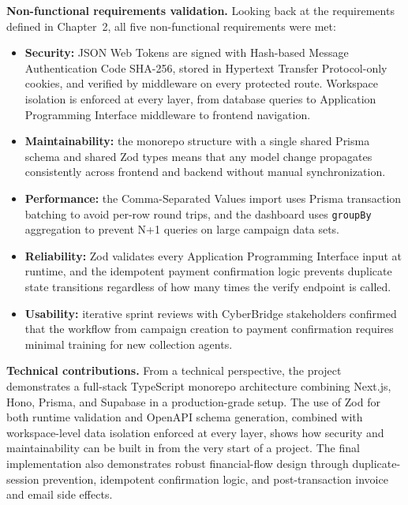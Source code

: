 \documentclass[12pt,a4paper]{report}
\begin{document}
\textbf{Non-functional requirements validation.}
Looking back at the requirements defined in Chapter~2, all five non-functional
requirements were met:
\begin{itemize}
  \item \textbf{Security:} JSON Web Tokens are signed with Hash-based Message Authentication Code SHA-256, stored in
        Hypertext Transfer Protocol-only cookies, and verified by middleware on every protected route.
        Workspace isolation is enforced at every layer, from database queries to
        Application Programming Interface middleware to frontend navigation.
  \item \textbf{Maintainability:} the monorepo structure with a single shared
        Prisma schema and shared Zod types means that any model change propagates
        consistently across frontend and backend without manual synchronization.
  \item \textbf{Performance:} the Comma-Separated Values import uses Prisma transaction batching to
        avoid per-row round trips, and the dashboard uses \texttt{groupBy}
        aggregation to prevent N+1 queries on large campaign data sets.
  \item \textbf{Reliability:} Zod validates every Application Programming Interface input at runtime, and the
        idempotent payment confirmation logic prevents duplicate state transitions
        regardless of how many times the verify endpoint is called.
  \item \textbf{Usability:} iterative sprint reviews with CyberBridge stakeholders
        confirmed that the workflow from campaign creation to payment confirmation
        requires minimal training for new collection agents.
\end{itemize}

\textbf{Technical contributions.}
From a technical perspective, the project demonstrates a full-stack TypeScript
monorepo architecture combining Next.js, Hono, Prisma, and Supabase in a
production-grade setup.
The use of Zod for both runtime validation and OpenAPI schema generation, combined
with workspace-level data isolation enforced at every layer, shows how security and
maintainability can be built in from the very start of a project.
The final implementation also demonstrates robust financial-flow design through
duplicate-session prevention, idempotent confirmation logic, and post-transaction
invoice and email side effects.
\end{document}
